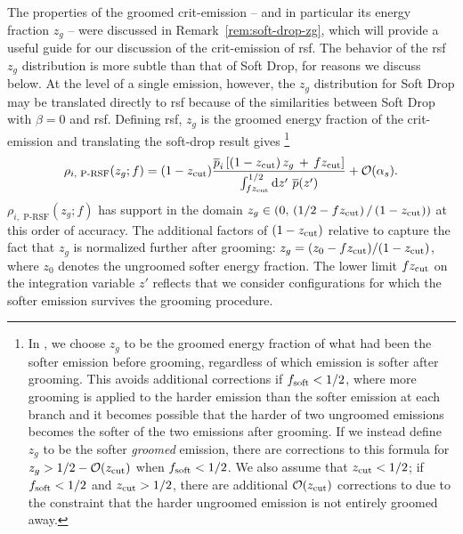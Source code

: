 The properties of the groomed \gls{crit-emission} -- and in particular its energy fraction \(z_g\) -- were discussed in Remark~\ref{rem:soft-drop-zg}, which will provide a useful guide for our discussion of the \gls{crit-emission} of \gls{rsf}.
%
The behavior of the \gls{rsf} \(z_g\) distribution is more subtle than that of Soft Drop, for reasons we discuss below.
%
At the level of a single emission, however, the \(z_g\) distribution for Soft Drop may be translated directly to \gls{rsf} because of the similarities between Soft Drop with \(\beta = 0\) and \gls{rsf}.
%
Defining \gls{rsf}, \(z_g\) is the groomed energy fraction of the \gls{crit-emission} and translating the \gls{soft-drop} result gives%
\footnote{
    In , we choose \(z_g\) to be the groomed energy fraction of what had been the softer emission before grooming, regardless of which emission is softer after grooming.
    This avoids additional corrections if \(f_{\rm soft} < 1/2\), where more grooming is applied to the harder emission than the softer emission at each branch and it becomes possible that the harder of two ungroomed emissions becomes the softer of the two emissions after grooming.
    If we instead define \(z_g\) to be the softer \textit{groomed} emission, there are corrections to this formula for \(z_g > 1/2 - \mathcal{O}(z_{\rm cut})\) when \(f_{\rm soft} < 1/2\).
    We also assume that \(z_{\rm cut} < 1/2\);
    if \(f_{\rm soft} < 1/2\) and \(z_{\rm cut} > 1/2\), there are additional \(\mathcal{O}(z_{\rm cut})\) corrections to  due to the constraint that the harder ungroomed emission is not entirely groomed away.
}
\begin{align}
    \rho_{i,\,\,\text{P-RSF}}(z_g; f)
    =
    (1-\zcut)
    \frac{
    \overline{p}_i\left[
        \left(1 - \zcut\right)z_g\,+\,f \zcut
    \right]
    }
    {\int_{f \zcut}^{1/2} \dd z' \,\, \overline{p}(z')}
    +
    \mathcal{O}(\alpha_s)
    \label{eq:prsf_zg_lo}
    .
\end{align}
\(\rho_{i,\,\,\text{P-RSF}}(z_g; f)\) has support in the domain \(z_g \in \left(0,\,(1/2 - fz_{\rm cut})\,/\,(1-z_{\rm cut})\right)\) at this order of accuracy.
%
The additional factors of \((1-z_{\rm cut})\) relative to  capture the fact that \(z_g\) is normalized further after grooming:
%
\(z_g = (z_0 - fz_{\rm cut})/(1-z_{\rm cut})\), where \(z_0\) denotes the ungroomed softer energy fraction.
%
The lower limit \(f z_{\rm cut}\) on the integration variable \(z'\) reflects that we consider configurations for which the softer emission survives the grooming procedure.

